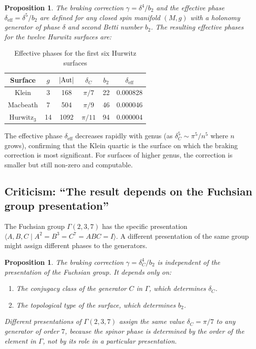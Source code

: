 \documentclass[12pt,a4paper]{article}
\newtheorem{proposition}[theorem]{Proposition}
\theoremstyle{definition}
\theoremstyle{remark}
\newcommand{\Aut}{\mathrm{Aut}}
\DeclarePairedDelimiter\abs{\lvert}{\rvert}
\begin{document}
\begin{proposition}
\label{prop:universality-criticism}
The braking correction $\gamma = \delta^4/b_2$ and the effective phase $\delta_{\mathrm{eff}} = \delta^5/b_2$ are defined for any closed spin manifold $(M, g)$ with a holonomy generator of phase $\delta$ and second Betti number $b_2$. The resulting effective phases for the twelve Hurwitz surfaces are:
\end{proposition}

\begin{table}[h]
\centering
\caption{Effective phases for the first six Hurwitz surfaces}
\label{tab:hurwitz}
\begin{tabular}{cccccc}
\toprule
Surface & $g$ & $\abs{\Aut}$ & $\delta_C$ & $b_2$ & $\delta_{\mathrm{eff}}$ \\
\midrule
Klein & 3 & 168 & $\pi/7$ & 22 & 0.000828 \\
Macbeath & 7 & 504 & $\pi/9$ & 46 & 0.000046 \\
Hurwitz$_3$ & 14 & 1092 & $\pi/11$ & 94 & 0.000004 \\
\bottomrule
\end{tabular}
\end{table}

The effective phase $\delta_{\mathrm{eff}}$ decreases rapidly with genus (as $\delta_C^5 \sim \pi^5/n^5$ where $n$ grows), confirming that the Klein quartic is the surface on which the braking correction is most significant. For surfaces of higher genus, the correction is smaller but still non-zero and computable.

\subsection{Criticism: ``The result depends on the Fuchsian group presentation''}

The Fuchsian group $\Gamma(2,3,7)$ has the specific presentation $\langle A, B, C \mid A^2 = B^3 = C^7 = ABC = I \rangle$. A different presentation of the same group might assign different phases to the generators.

\begin{proposition}
The braking correction $\gamma = \delta_C^4/b_2$ is independent of the presentation of the Fuchsian group. It depends only on:
\begin{enumerate}[label=(\roman*)]
\item The conjugacy class of the generator $C$ in $\Gamma$, which determines $\delta_C$.
\item The topological type of the surface, which determines $b_2$.
\end{enumerate}
Different presentations of $\Gamma(2,3,7)$ assign the same value $\delta_C = \pi/7$ to any generator of order $7$, because the spinor phase is determined by the order of the element in $\Gamma$, not by its role in a particular presentation.
\end{proposition}
\end{document}
